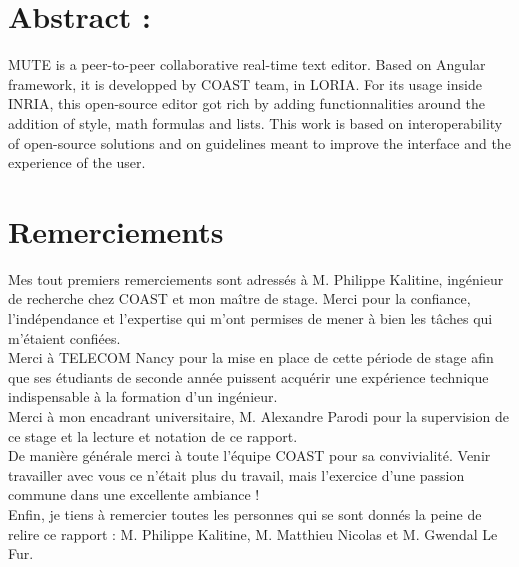 \documentclass[12pt]{article}
\begin{document}
\section*{Abstract :}
MUTE is a peer-to-peer collaborative real-time text editor. Based on Angular framework, it is developped by COAST team, in LORIA. For its usage inside INRIA, this open-source editor got rich by adding functionnalities around the addition of style, math formulas and lists. This work is based on interoperability of open-source solutions and on guidelines meant to improve the interface and the experience of the user.



\newpage
\thispagestyle{empty}
\section*{Remerciements}
Mes tout premiers remerciements sont adressés à M. Philippe Kalitine, ingénieur de recherche chez COAST et mon maître de stage. Merci pour la confiance, l'indépendance et l'expertise qui m'ont permises de mener à bien les tâches qui m'étaient confiées.\\

Merci à TELECOM Nancy pour la mise en place de cette période de stage afin que ses étudiants de seconde année puissent acquérir une expérience technique indispensable à la formation d'un ingénieur.\\

Merci à mon encadrant universitaire, M. Alexandre Parodi pour la supervision de ce stage et la lecture et notation de ce rapport.\\

De manière générale merci à toute l'équipe COAST pour sa convivialité. Venir travailler avec vous ce n'était plus du travail, mais l'exercice d'une passion commune dans une excellente ambiance !\\

Enfin, je tiens à remercier toutes les personnes qui se sont donnés la peine de relire ce rapport : M. Philippe Kalitine, M. Matthieu Nicolas et M. Gwendal Le Fur.

\newpage
\thispagestyle{empty}
\tableofcontents

\newpage
\setcounter{page}{1}
\end{document}
